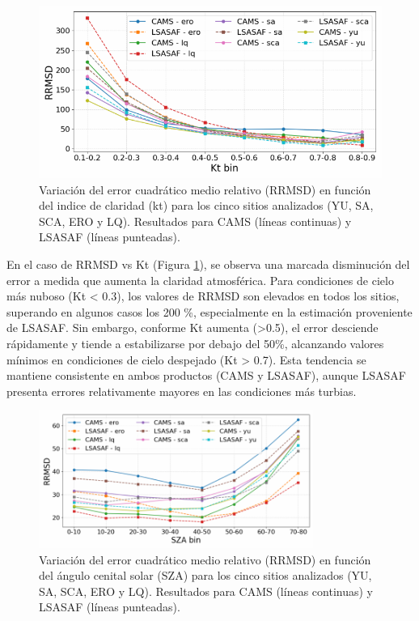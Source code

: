 \begin{figure}
    \centering
    \includegraphics[width=\linewidth]{figuras/RMSE-kt-15.pdf}
    \caption{Variación del error cuadrático medio relativo (RRMSD) en función del indice de claridad (kt) para los cinco sitios analizados (YU, SA, SCA, ERO y LQ). Resultados para CAMS (líneas continuas) y LSASAF (líneas punteadas).}
    \label{fig:RMSE-kt-15}
\end{figure}



En el caso de RRMSD vs Kt (Figura \ref{fig:RMSE-kt-15}), se observa una marcada disminución del error a medida que aumenta la claridad atmosférica. Para condiciones de cielo más nuboso (Kt < 0.3), los valores de RRMSD son elevados en todos los sitios, superando en algunos casos los 200 \%, especialmente en la estimación proveniente de LSASAF. Sin embargo, conforme Kt aumenta (>0.5), el error desciende rápidamente y tiende a estabilizarse por debajo del 50\%, alcanzando valores mínimos en condiciones de cielo despejado (Kt > 0.7). Esta tendencia se mantiene consistente en ambos productos (CAMS y LSASAF), aunque LSASAF presenta errores relativamente mayores en las condiciones más turbias.




\begin{figure}
    \centering
    \includegraphics[width=0.8\textwidth]{figuras/RMSE-sza-15.pdf}
    \caption{Variación del error cuadrático medio relativo (RRMSD) en función del ángulo cenital solar (SZA) para los cinco sitios analizados (YU, SA, SCA, ERO y LQ). Resultados para CAMS (líneas continuas) y LSASAF (líneas punteadas).}
    \label{fig:RMSE-SZA-15}
\end{figure}



